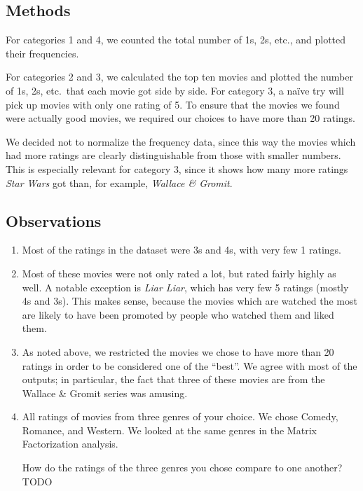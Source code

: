 \subsection{Methods}
For categories 1 and 4, we counted the total number of 1s, 2s, etc., and plotted their frequencies.  

For categories 2 and 3, we calculated the top ten movies and plotted the number of 1s, 2s, etc.\ that each movie got side by side.  For category 3, a na\"{i}ve try will pick up movies with only one rating of 5.  To ensure that the movies we found were actually good movies, we required our choices to have more than 20 ratings.

We decided not to normalize the frequency data, since this way the movies which had more ratings are clearly distinguishable from those with smaller numbers.  This is especially relevant for category 3, since it shows how many more ratings \emph{Star Wars} got than, for example, \emph{Wallace \& Gromit}.

\subsection{Observations}
\begin{enumerate}
    \item Most of the ratings in the dataset were 3s and 4s, with very few 1 ratings.  
    \item Most of these movies were not only rated a lot, but rated fairly highly as well.  A notable exception is \emph{Liar Liar}, which has very few 5 ratings (mostly 4s and 3s).  This makes sense, because the movies which are watched the most are likely to have been promoted by people who watched them and liked them.
    \item As noted above, we restricted the movies we chose to have more than 20 ratings in order to be considered one of the ``best''.  We agree with most of the outputs; in particular, the fact that three of these movies are from the Wallace \& Gromit series was amusing.
    \item All ratings of movies from three genres of your choice.  We chose Comedy, Romance, and Western.  We looked at the same genres in the Matrix Factorization analysis.

    How do the ratings of the three genres you chose compare to one another? TODO
\end{enumerate}



